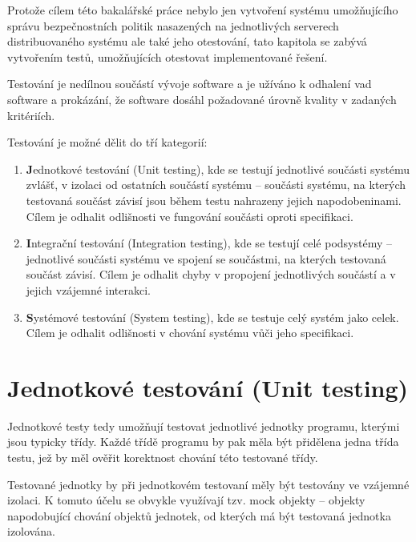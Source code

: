 Protože cílem této bakalářské práce nebylo jen vytvoření systému umožňujícího správu bezpečnostních politik nasazených na jednotlivých serverech distribuovaného systému ale také jeho otestování, tato kapitola se zabývá vytvořením testů, umožňujících otestovat implementované řešení.

Testování je nedílnou součástí vývoje software a je užíváno k odhalení vad software a prokázání, že software dosáhl požadované úrovně kvality v zadaných kritériích. \cite{ivsTest}

Testování je možné dělit do tří kategorií:

\begin{enumerate}
  \item {\textbf Jednotkové testování (Unit testing)}, kde se testují jednotlivé součásti systému zvlášť, v izolaci od ostatních součástí systému -- součásti systému, na kterých testovaná součást závisí jsou během testu nahrazeny jejich napodobeninami. Cílem je odhalit odlišnosti ve fungování součásti oproti specifikaci. \cite{ivsTest}
  \item {\textbf Integrační testování (Integration testing)}, kde se testují celé podsystémy -- jednotlivé součásti systému ve spojení se součástmi, na kterých testovaná součást závisí. Cílem je odhalit chyby v propojení jednotlivých součástí a v jejich vzájemné interakci. \cite{ivsTest}
  \item {\textbf Systémové testování (System testing)}, kde se testuje celý systém jako celek. Cílem je odhalit odlišnosti v chování systému vůči jeho specifikaci. \cite{ivsTest}
\end{enumerate}


\section{Jednotkové testování (Unit testing)}

Jednotkové testy tedy umožňují testovat jednotlivé jednotky programu, kterými jsou typicky třídy. Každé třídě programu by pak měla být přidělena jedna třída testu, jež by měl ověřit korektnost chování této testované třídy.

Testované jednotky by při jednotkovém testovaní měly být testovány ve vzájemné izolaci. K tomuto účelu se obvykle využívají tzv. mock objekty -- objekty napodobující chování objektů jednotek, od kterých má být testovaná jednotka izolována.

